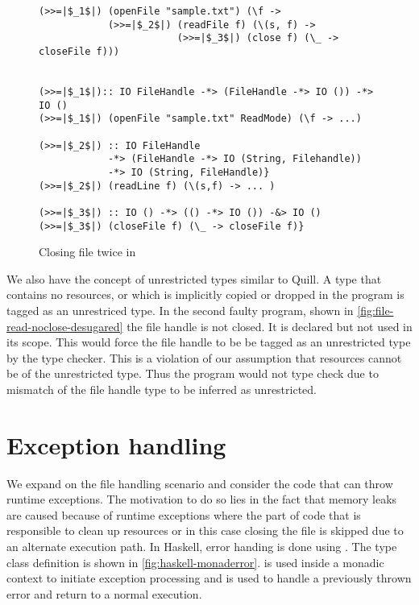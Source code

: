 \begin{figure}[h]
\begin{framed}
\begin{verbatim}
(>>=|$_1$|) (openFile "sample.txt") (\f ->
            (>>=|$_2$|) (readFile f) (\(s, f) ->
                        (>>=|$_3$|) (close f) (\_ -> closeFile f)))


(>>=|$_1$|):: IO FileHandle -*> (FileHandle -*> IO ()) -*> IO ()
(>>=|$_1$|) (openFile "sample.txt" ReadMode) (\f -> ...)

(>>=|$_2$|) :: IO FileHandle
            -*> (FileHandle -*> IO (String, Filehandle))
            -*> IO (String, FileHandle)}
(>>=|$_2$|) (readLine f) (\(s,f) -> ... )

(>>=|$_3$|) :: IO () -*> (() -*> IO ()) -&> IO ()
(>>=|$_3$|) (closeFile f) (\_ -> closeFile f)}
\end{verbatim}
\end{framed}
\caption{Closing file twice in \qub{}}
\label{fig:qub-close-file-twice}
\end{figure}

We also have the concept of unrestricted types similar to Quill. A type that contains no resources, or which is implicitly
copied or dropped in the program is tagged as an unrestriced type. In the second faulty program,
shown in \cref{fig:file-read-noclose-desugared} the file handle  is not closed.
It is declared but not used in its scope. This would force the file handle to be be tagged as an unrestricted type by the \qub{} type checker.
This is a violation of our assumption that resources cannot be of the unrestricted type. Thus
the program would not type check due to mismatch of the file handle type to be inferred as unrestricted.


\section{Exception handling}
We expand on the file handling scenario and consider the code that can throw runtime exceptions.
The motivation to do so lies in the fact that memory leaks are caused because of runtime
exceptions where the part of code that is responsible to clean up resources or in this case
closing the file is skipped due to an alternate execution path. In Haskell, error handing is done using .
The type class definition is shown in \cref{fig:haskell-monaderror}.  is used inside a monadic context to initiate
exception processing and  is used to handle a previously thrown error and return
to a normal execution.

